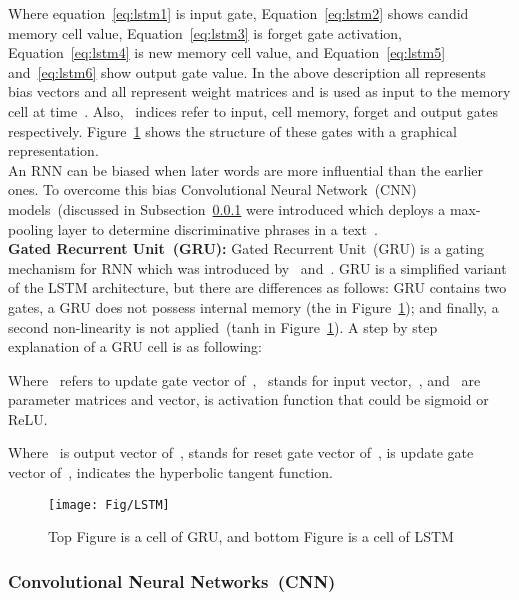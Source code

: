 \documentclass[sigconf, final]{acmart}
\begin{document}
Where equation~\ref{eq:lstm1} is input gate, Equation~\ref{eq:lstm2} shows candid memory cell value, Equation~\ref{eq:lstm3} is forget gate activation, Equation~\ref{eq:lstm4} is new memory cell value, and  Equation~\ref{eq:lstm5} and~\ref{eq:lstm6} show output gate value. In the above description all  represents bias vectors and all  represent weight matrices and  is used as input to the memory cell at time~. Also,~ indices refer to input, cell memory, forget and output gates respectively.
 Figure~\ref{fig:LSTM} shows the structure of these gates with a graphical representation.\\
An RNN can be biased when later words are more influential than the earlier ones. To overcome this bias Convolutional Neural Network~(CNN)  models~(discussed in Subsection~\ref{subsubsec:CNN} were introduced which deploys a max-pooling layer to determine discriminative phrases in a text~\cite{lai2015recurrent}.\\




\textbf{Gated Recurrent Unit~(GRU):}\label{subsec:GRU}
Gated Recurrent Unit~(GRU) is a gating mechanism for RNN which was introduced by~\cite{chung2014empirical} and~\cite{cho2014learning}. GRU is a simplified variant of the
LSTM architecture, but there are differences as follows: GRU contains two gates, a GRU does not possess internal memory (the  in Figure~\ref{fig:LSTM}); and finally, a second non-linearity is not applied~(tanh in Figure~\ref{fig:LSTM}). A step by step explanation of a GRU cell is as following:

Where~ refers to update gate vector of~,~ stands for input vector,~,  and~ are parameter matrices and vector,  is activation function that could be sigmoid or ReLU.


Where~ is output vector of~,  stands for reset gate vector of~,  is update gate vector of~,  indicates the hyperbolic tangent function.


\begin{figure}[b]
\vspace{-0.15in}
\centering
\texttt{[image: Fig/LSTM]}
\vspace{-0.15in}
\caption{Top Figure is a cell of GRU, and bottom Figure is a cell of LSTM}\label{fig:LSTM}

\end{figure}



\subsubsection{Convolutional Neural Networks~(CNN)}\label{subsubsec:CNN}
\end{document}
